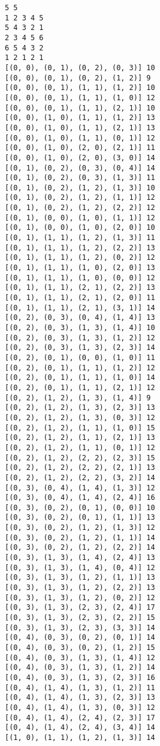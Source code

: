 \documentclass[11pt]{article}
\begin{document}
    \begin{Verbatim}[commandchars=\\\{\}]
5 5
1 2 3 4 5
5 4 3 2 1
2 3 4 5 6
6 5 4 3 2
1 2 1 2 1
[(0, 0), (0, 1), (0, 2), (0, 3)] 10
[(0, 0), (0, 1), (0, 2), (1, 2)] 9
[(0, 0), (0, 1), (1, 1), (1, 2)] 10
[(0, 0), (0, 1), (1, 1), (1, 0)] 12
[(0, 0), (0, 1), (1, 1), (2, 1)] 10
[(0, 0), (1, 0), (1, 1), (1, 2)] 13
[(0, 0), (1, 0), (1, 1), (2, 1)] 13
[(0, 0), (1, 0), (1, 1), (0, 1)] 12
[(0, 0), (1, 0), (2, 0), (2, 1)] 11
[(0, 0), (1, 0), (2, 0), (3, 0)] 14
[(0, 1), (0, 2), (0, 3), (0, 4)] 14
[(0, 1), (0, 2), (0, 3), (1, 3)] 11
[(0, 1), (0, 2), (1, 2), (1, 3)] 10
[(0, 1), (0, 2), (1, 2), (1, 1)] 12
[(0, 1), (0, 2), (1, 2), (2, 2)] 12
[(0, 1), (0, 0), (1, 0), (1, 1)] 12
[(0, 1), (0, 0), (1, 0), (2, 0)] 10
[(0, 1), (1, 1), (1, 2), (1, 3)] 11
[(0, 1), (1, 1), (1, 2), (2, 2)] 13
[(0, 1), (1, 1), (1, 2), (0, 2)] 12
[(0, 1), (1, 1), (1, 0), (2, 0)] 13
[(0, 1), (1, 1), (1, 0), (0, 0)] 12
[(0, 1), (1, 1), (2, 1), (2, 2)] 13
[(0, 1), (1, 1), (2, 1), (2, 0)] 11
[(0, 1), (1, 1), (2, 1), (3, 1)] 14
[(0, 2), (0, 3), (0, 4), (1, 4)] 13
[(0, 2), (0, 3), (1, 3), (1, 4)] 10
[(0, 2), (0, 3), (1, 3), (1, 2)] 12
[(0, 2), (0, 3), (1, 3), (2, 3)] 14
[(0, 2), (0, 1), (0, 0), (1, 0)] 11
[(0, 2), (0, 1), (1, 1), (1, 2)] 12
[(0, 2), (0, 1), (1, 1), (1, 0)] 14
[(0, 2), (0, 1), (1, 1), (2, 1)] 12
[(0, 2), (1, 2), (1, 3), (1, 4)] 9
[(0, 2), (1, 2), (1, 3), (2, 3)] 13
[(0, 2), (1, 2), (1, 3), (0, 3)] 12
[(0, 2), (1, 2), (1, 1), (1, 0)] 15
[(0, 2), (1, 2), (1, 1), (2, 1)] 13
[(0, 2), (1, 2), (1, 1), (0, 1)] 12
[(0, 2), (1, 2), (2, 2), (2, 3)] 15
[(0, 2), (1, 2), (2, 2), (2, 1)] 13
[(0, 2), (1, 2), (2, 2), (3, 2)] 14
[(0, 3), (0, 4), (1, 4), (1, 3)] 12
[(0, 3), (0, 4), (1, 4), (2, 4)] 16
[(0, 3), (0, 2), (0, 1), (0, 0)] 10
[(0, 3), (0, 2), (0, 1), (1, 1)] 13
[(0, 3), (0, 2), (1, 2), (1, 3)] 12
[(0, 3), (0, 2), (1, 2), (1, 1)] 14
[(0, 3), (0, 2), (1, 2), (2, 2)] 14
[(0, 3), (1, 3), (1, 4), (2, 4)] 13
[(0, 3), (1, 3), (1, 4), (0, 4)] 12
[(0, 3), (1, 3), (1, 2), (1, 1)] 13
[(0, 3), (1, 3), (1, 2), (2, 2)] 13
[(0, 3), (1, 3), (1, 2), (0, 2)] 12
[(0, 3), (1, 3), (2, 3), (2, 4)] 17
[(0, 3), (1, 3), (2, 3), (2, 2)] 15
[(0, 3), (1, 3), (2, 3), (3, 3)] 14
[(0, 4), (0, 3), (0, 2), (0, 1)] 14
[(0, 4), (0, 3), (0, 2), (1, 2)] 15
[(0, 4), (0, 3), (1, 3), (1, 4)] 12
[(0, 4), (0, 3), (1, 3), (1, 2)] 14
[(0, 4), (0, 3), (1, 3), (2, 3)] 16
[(0, 4), (1, 4), (1, 3), (1, 2)] 11
[(0, 4), (1, 4), (1, 3), (2, 3)] 13
[(0, 4), (1, 4), (1, 3), (0, 3)] 12
[(0, 4), (1, 4), (2, 4), (2, 3)] 17
[(0, 4), (1, 4), (2, 4), (3, 4)] 14
[(1, 0), (1, 1), (1, 2), (1, 3)] 14

\end{Verbatim}
\end{document}
